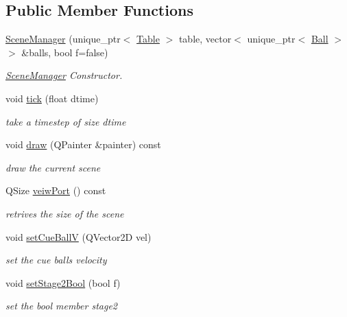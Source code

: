 \subsection*{Public Member Functions}
\begin{DoxyCompactItemize}
\item 
\mbox{\hyperlink{class_scene_manager_aeaf8d1701d0624f47f0274f2642154f2}{Scene\+Manager}} (unique\+\_\+ptr$<$ \mbox{\hyperlink{class_table}{Table}} $>$ table, vector$<$ unique\+\_\+ptr$<$ \mbox{\hyperlink{class_ball}{Ball}} $>$$>$ \&balls, bool f=false)
\begin{DoxyCompactList}\small\item\em \mbox{\hyperlink{class_scene_manager}{Scene\+Manager}} Constructor. \end{DoxyCompactList}\item 
void \mbox{\hyperlink{class_scene_manager_a1692dc970086f1cc481000da605c4628}{tick}} (float dtime)
\begin{DoxyCompactList}\small\item\em take a timestep of size dtime \end{DoxyCompactList}\item 
void \mbox{\hyperlink{class_scene_manager_a1acae2e8e78a37c3cb17c5d90a5882ca}{draw}} (Q\+Painter \&painter) const
\begin{DoxyCompactList}\small\item\em draw the current scene \end{DoxyCompactList}\item 
Q\+Size \mbox{\hyperlink{class_scene_manager_ad1c7f8a0c3e2e7d9211a442cd24253d4}{veiw\+Port}} () const
\begin{DoxyCompactList}\small\item\em retrives the size of the scene \end{DoxyCompactList}\item 
void \mbox{\hyperlink{class_scene_manager_a543db38edb424561aa3f0d845ed5c32a}{set\+Cue\+BallV}} (Q\+Vector2D vel)
\begin{DoxyCompactList}\small\item\em set the cue ball\textquotesingle{}s velocity \end{DoxyCompactList}\item 
void \mbox{\hyperlink{class_scene_manager_af7f98cdad994d8f8b982239ff54363da}{set\+Stage2\+Bool}} (bool f)
\begin{DoxyCompactList}\small\item\em set the bool member stage2 \end{DoxyCompactList}\item 
$$
\end{DoxyCompactItemize}
